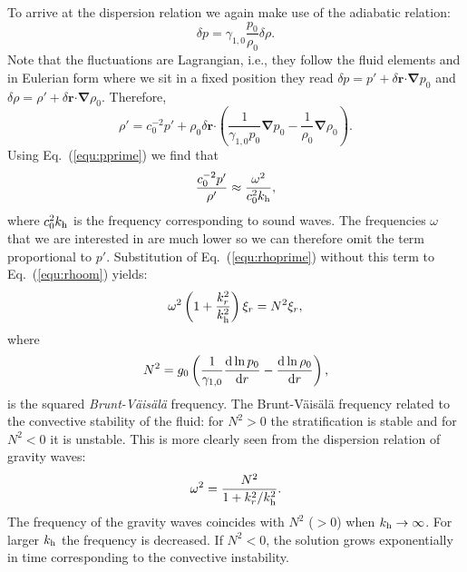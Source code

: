 \documentclass[12pt]{article}
\newcommand{\rrr}{\bm{r}}
\begin{document}
To arrive at the dispersion relation we again make use of the
adiabatic relation:
\begin{equation}
\delta p = \gamma_{1,0} \frac{p_0}{\rho_0} \delta \rho.
\end{equation}
Note that the fluctuations are Lagrangian, i.e., they follow the fluid
elements and in Eulerian form where we sit in a fixed position they
read $\delta p = p' + \delta\rrr\bm\cdot\bm\nabla p_0$ and $\delta
\rho = \rho' + \delta\rrr\bm\cdot\bm\nabla\rho_0$. Therefore,
\begin{equation}
\rho' = c_0^{-2} p' + \rho_0 \delta\rrr\bm\cdot \left( \frac{1}{\gamma_{1,0} p_0}\bm\nabla p_0 - \frac{1}{\rho_0}\bm\nabla \rho_0 \right).\label{equ:rhoprime}
\end{equation}
Using Eq.~(\ref{equ:pprime}) we find that
\begin{equation}
\frac{c_0^{-2}p'}{\rho'} \approx \frac{\omega^2}{c_0^2k_{\rm h}},
\end{equation}
where $c_0^2k_{\rm h}$ is the frequency corresponding to sound
waves. The frequencies $\omega$ that we are interested in are much
lower so we can therefore omit the term proportional to $p'$.
Substitution of Eq.~(\ref{equ:rhoprime}) without this term to
Eq.~(\ref{equ:rhoom}) yields:
\begin{equation}
\omega^2 \left( 1 + \frac{k_r^2}{k_{\rm h}^2} \right) \xi_r = N^2 \xi_r,
\end{equation}
where
\begin{equation}
N^2 = g_0 \left( \frac{1}{\gamma_{1,0}} \frac{{\rm d}\ln p_0}{{\rm d}r} - \frac{{\rm d}\ln \rho_0}{{\rm d}r} \right),
\end{equation}
is the squared \emph{Brunt-V\"ais\"al\"a} frequency. The
Brunt-V\"ais\"al\"a frequency related to the convective stability of
the fluid: for $N^2>0$ the stratification is stable and for $N^2<0$ it
is unstable. This is more clearly seen from the dispersion relation of
gravity waves:
\begin{equation}
\omega^2 = \frac{N^2}{1 + k_r^2/k_{\rm h}^2}.
\end{equation}
The frequency of the gravity waves coincides with $N^2$ ($>0$) when
$k_{\rm h} \rightarrow \infty$. For larger $k_{\rm h}$ the frequency is
decreased. If $N^2<0$, the solution grows exponentially in time
corresponding to the convective instability.


\end{document}
